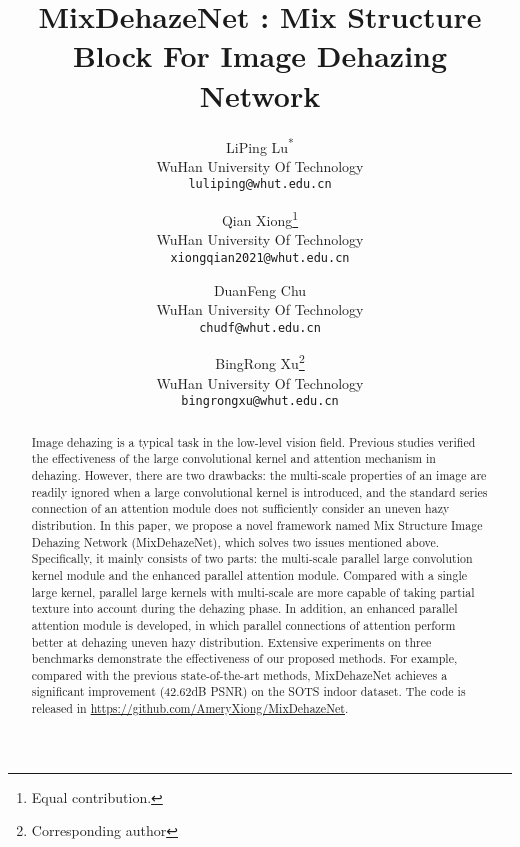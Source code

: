 \documentclass[10pt,twocolumn,letterpaper]{article}
\begin{document}
\title{MixDehazeNet : Mix Structure Block For Image Dehazing Network}

\author{LiPing Lu\textsuperscript{*}\\
WuHan University Of Technology\\
{\tt\small luliping@whut.edu.cn}
\and
Qian Xiong\thanks{Equal contribution.}\\
WuHan University Of Technology\\
{\tt\small xiongqian2021@whut.edu.cn}
\and
DuanFeng Chu\\
WuHan University Of Technology\\
{\tt\small chudf@whut.edu.cn}
\and
BingRong Xu\thanks{Corresponding author}\\
WuHan University Of Technology\\
{\tt\small bingrongxu@whut.edu.cn}
}

\maketitle
\ificcvfinal\thispagestyle{empty}\fi


\begin{abstract}
Image dehazing is a typical task in the low-level vision field. Previous studies verified the effectiveness of the large convolutional kernel and attention mechanism in dehazing. However, there are two drawbacks: the multi-scale properties of an image are readily ignored when a large convolutional kernel is introduced, and the standard series connection of an attention module does not sufficiently consider an uneven hazy distribution. In this paper, we propose a novel framework named Mix Structure Image Dehazing Network (MixDehazeNet), which solves two issues mentioned above. Specifically, it mainly consists of two parts: the multi-scale parallel large convolution kernel module and the enhanced parallel attention module. Compared with a single large kernel, parallel large kernels with multi-scale are more capable of taking partial texture into account during the dehazing phase. In addition, an enhanced parallel attention module is developed, in which parallel connections of attention perform better at dehazing uneven hazy distribution. Extensive experiments on three benchmarks demonstrate the effectiveness of our proposed methods. For example, compared with the previous state-of-the-art methods, MixDehazeNet achieves a significant improvement (42.62dB PSNR) on the SOTS indoor dataset.  The code is released in \url{https://github.com/AmeryXiong/MixDehazeNet}.





\end{abstract}
\end{document}
